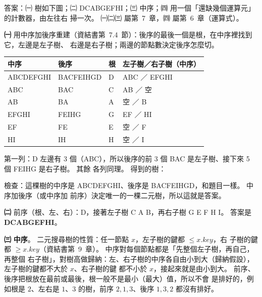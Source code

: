 \begin{pastsoln}
答案：㈠ 樹如下圖；㈡ DCABGEFHI；㈢ 中序；㈣ 用一個「還缺幾個運算元」的計數器，由左往右
掃一次。 ㈠㈡㈢ 屬第~7~章，㈣ 屬第~6~章（運算式）。

\textbf{㈠} 用中序加後序重建（資結書第~7.4~節）：後序的最後一個是根，在中序裡找到它，左邊是左子樹、
右邊是右子樹；兩邊的節點數決定後序怎麼切。
\begin{center}
\small
\begin{tabular}{llll}
\toprule
中序 & 後序 & 根 & 左子樹／右子樹（中序） \\
\midrule
ABCDEFGHI & BACFEIHGD & D & ABC ／ EFGHI \\
ABC & BAC & C & AB ／ 空 \\
AB & BA & A & 空 ／ B \\
EFGHI & FEIHG & G & EF ／ HI \\
EF & FE & E & 空 ／ F \\
HI & IH & H & 空 ／ I \\
\bottomrule
\end{tabular}
\end{center}
第一列：D 左邊有 3 個（ABC），所以後序的前 3 個 BAC 是左子樹、接下來 5 個 FEIHG 是右子樹。 其餘
各列同理。 得到的樹：
\begin{center}
\end{center}
檢查：這棵樹的中序是 ABCDEFGHI、後序是 BACFEIHGD，和題目一樣。 中序加後序（或中序加
前序）決定唯一的一棵二元樹，所以這就是答案。

\textbf{㈡} 前序（根、左、右）：D，接著左子樹 C A B，再右子樹 G E F H I。 答案是
\textbf{DCABGEFHI}。

\textbf{㈢} \textbf{中序}。 二元搜尋樹的性質：任一節點 $x$，左子樹的鍵都 $\le x.\mathit{key}$，右
子樹的鍵都 $\ge x.\mathit{key}$（資結書第~9~章）。 中序對每個節點都是「先整個左子樹，再自己，再整個
右子樹」，對樹高做歸納：左、右子樹的中序各自由小到大（歸納假設），左子樹的鍵都不大於 $x$、右子樹的鍵
都不小於 $x$，接起來就是由小到大。 前序、後序把根放在最前或最後，根一般不是最小（最大）值，所以不會
是排好的，例如根是 $2$、左右是 $1$、$3$ 的樹，前序 $2, 1, 3$、後序 $1, 3, 2$ 都沒有排好。


\end{pastsoln}
